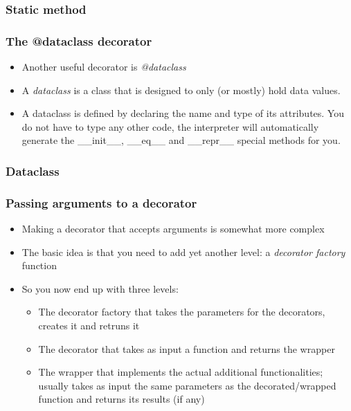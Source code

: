 \documentclass[9pt]{beamer}
\begin{document}
\begin{frame}
  \frametitle{Static method}
  
\end{frame}


\begin{frame}
  \frametitle{The @dataclass decorator}
  \begin{itemize}
    \item Another useful decorator is \emph{@dataclass}
    \medskip
    \item A \alert{\emph{dataclass}} is a class that is designed to only (or mostly)
          hold data values.
    \medskip
    \item A dataclass is defined by declaring the name and type of its attributes. 
    You do not have to type any other code, the interpreter will automatically 
    generate the \_\_init\_\_, \_\_eq\_\_ and \_\_repr\_\_ special methods for you.  
  \end{itemize}
\end{frame}


\begin{frame}
  \frametitle{Dataclass}
  
\end{frame}


\begin{frame}
  \frametitle{Passing arguments to a decorator}
  \begin{itemize}
    \item Making a decorator that accepts arguments is somewhat more complex
    \smallskip
    \item The basic idea is that you need to add yet another level: a 
          \emph{decorator factory} function
    \smallskip
    \item So you now end up with three levels:
    \smallskip
    \begin{itemize}
      \item The decorator factory that takes the parameters for the decorators, creates it and retruns it
      \item The decorator that takes as input a function and returns the wrapper
      \item The wrapper that implements the actual additional functionalities;
            usually takes as input the same parameters as the decorated/wrapped
            function and returns its results (if any)
    \end{itemize}
  \end{itemize}
\end{frame}
\end{document}
